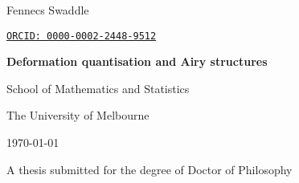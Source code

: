 
{

\begin{titlepage}

{\Large Fennecs Swaddle}

{\tt \href{https://orcid.org/
0000-0002-2448-9512}{ORCID: 0000-0002-2448-9512}}

\vspace{2cm} 


\textbf{\semihuge\color{offblack}  Deformation quantisation and Airy structures}

\vspace{2cm} 



School of Mathematics and Statistics

The University of Melbourne

\today 
\vfill 

{\vspace{2cm}A thesis submitted for the degree of Doctor of Philosophy }





\end{titlepage}
}

